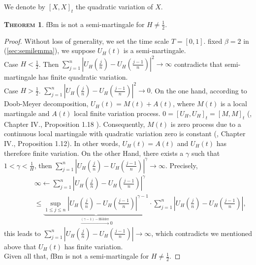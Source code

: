 \documentclass[a4paper, twoside, 11pt]{article}
\theoremstyle{definition}
\newtheorem{theorem}[definition]{\scshape Theorem}
\begin{document}
  We denote by $[X, X]_t$ the quadratic variation of $X$.
  \begin{theorem}
	fBm is not a semi-martingale for $H\neq \frac{1}{2}$.
  \end{theorem}
  \begin{proof}
	Without loss of generality, we set the time scale $T=[0, 1]$. fixed $\beta=2$ in (\ref{sec:semilemma}), we suppose $U_H(t)$ is a semi-martingale.\\
	Case $H < \frac{1}{2}$. Then $\sum_{j=1}^n |U_H(\frac{j}{n}) - U_H(\frac{j-1}{n})|^2\rightarrow\infty$ contradicts that semi-martingale has finite quadratic variation.\\
	Case $H > \frac{1}{2}$. $\sum_{j=1}^n |U_H(\frac{j}{n}) - U_H(\frac{j-1}{n})|^2\rightarrow 0$. On the one hand, according to Doob-Meyer decomposition, $U_H(t) = M(t) + A(t)$, where $M(t)$ is a local martingale and $A(t)$ local finite variation process. 	
	 $0=[U_H, U_H]_t = [M, M]_t $  (\cite{revuz}, Chapter IV., Proposition 1.18 ). Consequently, $M(t)$ is zero process due to a continuous local martingale with quadratic variation zero is constant (\cite{revuz}, Chapter IV., Proposition 1.12).
  In other words, $U_H(t)=A(t)$ and $U_H(t)$ has therefore finite variation. On the other Hand, there exists a $\gamma$ such that $1<\gamma<\frac{1}{H}$,  then $\sum_{j=1}^n |U_H(\frac{j}{n}) - U_H(\frac{j-1}{n})|^\gamma \rightarrow \infty$. Precisely, 
	\begin{eqnarray*}
	   &&\infty \leftarrow \sum_{j=1}^n |U_H(\frac{j}{n}) - U_H(\frac{j-1}{n})|^\gamma\\
	   &\hspace{2em}&\le \underbrace{\sup\limits_{1\le j\le n}|U_H(\frac{j}{n}) - U_H(\frac{j-1}{n})|^{\gamma-1}}_{\overset{(\gamma-1)-\text{H\"older}}{\rightarrow}0} \cdot \sum_{j=1}^n|U_H(\frac{j}{n}) - U_H(\frac{j-1}{n})|,
	\end{eqnarray*}
	this leads to $\sum_{j=1}^n|U_H(\frac{j}{n}) - U_H(\frac{j-1}{n})|\rightarrow \infty$, which contradicts we mentioned above that $U_H(t)$ has finite variation.\\
	Given all that, fBm is not a semi-martingale for $H\neq \frac{1}{2}$.
  \end{proof}
\end{document}
